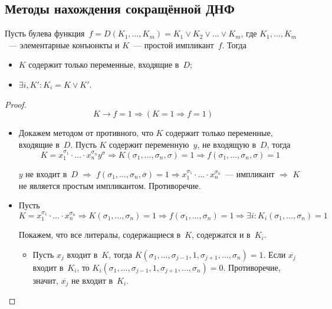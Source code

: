 \subsection{Методы нахождения сокращённой ДНФ}
\begin{statement}
\label{st:about_prime_implicants_1}
Пусть булева функция~$f = D(K_1, \ldots, K_m) = K_1 \lor K_2 \lor \ldots \lor K_m$, где $K_1, \ldots, K_m$~--- элементарные конъюнкты и $K$~--- простой импликант~$f$.
Тогда
\begin{itemize}
	\item $K$ содержит только переменные, входящие в~$D$;
	\item $\exists i, K' \colon K_i = K \lor K'$.
\end{itemize}
\end{statement}
\begin{proof}
\begin{equation*}
K \rightarrow f = 1 \Rightarrow (K = 1 \Rightarrow f = 1)
\end{equation*}
\begin{itemize}
	\item Докажем методом от противного, что $K$ содержит только переменные, входящие в~$D$.
	Пусть $K$ содержит переменную~$y$, не входящую в~$D$, тогда
	\begin{equation*}
	K = x_1^{\sigma_1} \cdot \ldots \cdot x_n^{\sigma_n} y^\sigma \Rightarrow
	K(\sigma_1, \ldots, \sigma_n, \sigma) = 1 \Rightarrow
	f(\sigma_1, \ldots, \sigma_n, \sigma) = 1
	\end{equation*}
	
	$y$ не входит в~$D$ $\Rightarrow$ $f(\sigma_1, \ldots, \sigma_n, \overline\sigma) = 1 \Rightarrow x_1^{\sigma_1} \cdot \ldots \cdot x_n^{\sigma_n}$~--- импликант $\Rightarrow$ $K$ не является простым импликантом.
	Противоречие.
	
	\item Пусть
	\begin{equation*}
	K = x_1^{\sigma_1} \cdot \ldots \cdot x_n^{\sigma_n} \Rightarrow
	K(\sigma_1, \ldots, \sigma_n) = 1 \Rightarrow
	f(\sigma_1, \ldots, \sigma_n) = 1 \Rightarrow
	\exists i \colon K_i(\sigma_1, \ldots, \sigma_n) = 1
	\end{equation*}
	
	Покажем, что все литералы, содержащиеся в~$K$, содержатся и в~$K_i$.
	\begin{itemize}
		\item Пусть $x_j$ входит в~$K$, тогда $K(\sigma_1, \ldots, \sigma_{j-1}, 1, \sigma_{j+1}, \ldots, \sigma_n) = 1$.
		Если $\overline{x_j}$ входит в~$K_i$, то $K_i(\sigma_1, \ldots, \sigma_{j-1}, 1, \sigma_{j+1}, \ldots, \sigma_n) = 0$.
		Противоречие, значит, $\overline{x_j}$ не входит в~$K_i$.
		

\end{itemize}
\end{itemize}
\end{proof}
